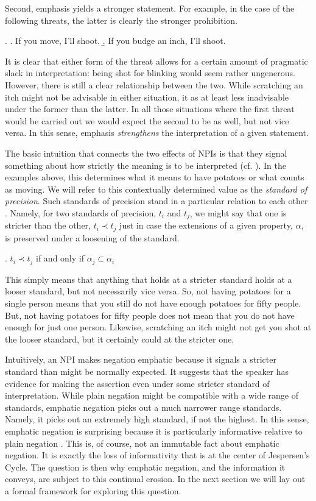 \documentclass[12pt]{article}
\theoremstyle{definition} \newtheorem{definition}{Definition}
\begin{document}
Second, emphasis yields a stronger statement. For example, in the case of the following threats, the latter is clearly the stronger prohibition.

  \ex. \a. If you move, I'll shoot.
       \b. If you budge an inch, I'll shoot.

It is clear that either form of the threat allows for a certain amount of pragmatic slack in interpretation: being shot for blinking would seem rather ungenerous. However, there is still a clear relationship between the two. While scratching an itch might not be advisable in either situation, it as at least less inadvisable under the former than the latter. In all those situations where the first threat would be carried out we would expect the second to be as well, but not vice versa. In this sense, emphasis \emph{strengthens} the interpretation of a given statement.

The basic intuition that connects the two effects of NPIs is that they signal something about how strictly the meaning is to be interpreted (cf. \citealt{lewis1970,landman1991}). In the examples above, this determines what it means to have potatoes or what counts as moving. We will refer to this contextually determined value as the \emph{standard of precision}. Such standards of precision stand in a particular relation to each other \citep{krifka1995polarity}. Namely, for two standards of precision, $t_i$ and $t_j$, we might say that one is stricter than the other, $t_i \prec t_j$ just in case the extensions of a given property, $\alpha$, is preserved under a loosening of the standard. 

\ex. $t_i \prec t_j$ if and only if $\alpha_j \subset \alpha_i$

This simply means that anything that holds at a stricter standard holds at a looser standard, but not necessarily vice versa. So, not having potatoes for a single person means that you still do not have enough potatoes for fifty people. But, not having potatoes for fifty people does not mean that you do not have enough for just one person. Likewise, scratching an itch might not get you shot at the looser standard, but it certainly could at the stricter one.

Intuitively, an NPI makes negation emphatic because it signals a stricter standard than might be normally expected. It suggests that the speaker has evidence for making the assertion even under some stricter standard of interpretation. While plain negation might be compatible with a wide range of standards, emphatic negation picks out a much narrower range standards. Namely, it picks out an extremely high standard, if not the highest. In this sense, emphatic negation is surprising because it is particularly informative relative to plain negation \citep{israel1998,israel2001}. This is, of course, not an immutable fact about emphatic negation. It is exactly the loss of informativity that is at the center of Jespersen's Cycle. The question is then why emphatic negation, and the information it conveys, are subject to this continual erosion. In the next section we will lay out a formal framework for exploring this question.
\end{document}
